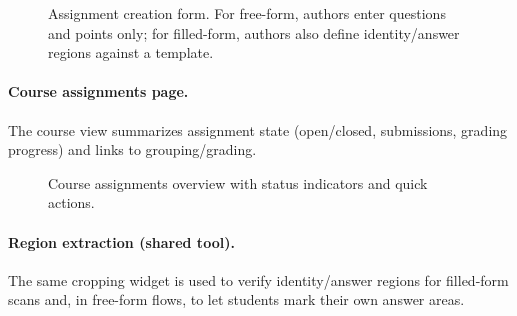 \documentclass[ms,twoside,print]{nuthesis}
\begin{document}
\begin{figure}[htb]
  \centering
  \caption{Assignment creation form. For free-form, authors enter questions and points only; for filled-form, authors also define identity/answer regions against a template.}
  \label{fig:assignment-creation}
\end{figure}

\paragraph{Course assignments page.}
The course view summarizes assignment state (open/closed, submissions, grading progress) and links to grouping/grading.

\begin{figure}[htb]
  \centering
  \caption{Course assignments overview with status indicators and quick actions.}
  \label{fig:course-page}
\end{figure}

\paragraph{Region extraction (shared tool).}
The same cropping widget is used to verify identity/answer regions for filled-form scans and, in free-form flows, to let students mark their own answer areas.
\end{document}
